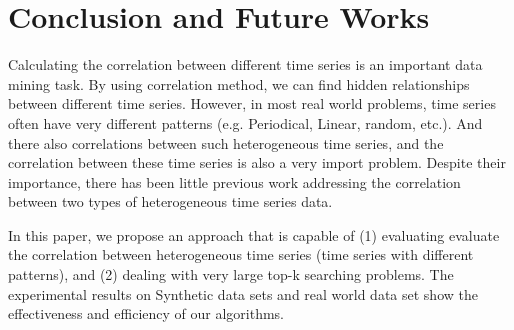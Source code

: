 \section{Conclusion and Future Works}

Calculating the correlation between different time series is an important data mining task. By using correlation method, we can find hidden relationships between different time series. 
However, in most real world problems, time series often have very different patterns (e.g. Periodical, Linear, random, etc.). And there also correlations between such heterogeneous time series, and the correlation between these time series is also a very import problem.
Despite their importance, there has been little previous work addressing the correlation between two types of heterogeneous time series data.

In this paper, we propose an approach that is capable of (1) evaluating evaluate the correlation between heterogeneous time series (time series with different patterns), and (2) dealing with very large top-k searching problems.
The experimental results on Synthetic data sets and real world data set show
the effectiveness and efficiency of our algorithms.